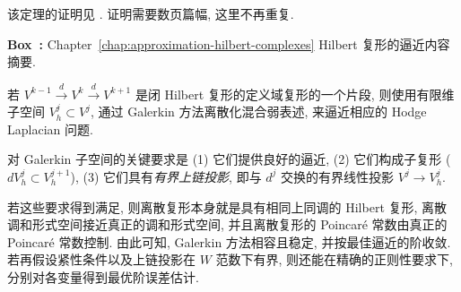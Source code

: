 该定理的证明见 . 证明需要数页篇幅, 这里不再重复.

\begin{MBSourceBox}
\label{box:approximation-hilbert-summary}
\noindent\textbf{Box~\thebooksummary:} {Chapter~\ref{chap:approximation-hilbert-complexes} Hilbert 复形的逼近内容摘要.}\par

若 $V^{k-1}\xrightarrow{d}V^k\xrightarrow{d}V^{k+1}$ 是闭 Hilbert 复形的定义域复形的一个片段, 则使用有限维子空间 $V_h^j\subset V^j$, 通过 Galerkin 方法离散化混合弱表述, 来逼近相应的 Hodge Laplacian 问题.

对 Galerkin 子空间的关键要求是 (1) 它们提供良好的逼近, (2) 它们构成子复形 ($dV_h^j\subset V_h^{j+1}$), (3) 它们具有\emph{有界上链投影}, 即与 $d^j$ 交换的有界线性投影 $V^j\to V_h^j$.

若这些要求得到满足, 则离散复形本身就是具有相同上同调的 Hilbert 复形, 离散调和形式空间接近真正的调和形式空间, 并且离散复形的 Poincaré 常数由真正的 Poincaré 常数控制. 由此可知, Galerkin 方法相容且稳定, 并按最佳逼近的阶收敛. 若再假设紧性条件以及上链投影在 $W$ 范数下有界, 则还能在精确的正则性要求下, 分别对各变量得到最优阶误差估计.
\end{MBSourceBox}
